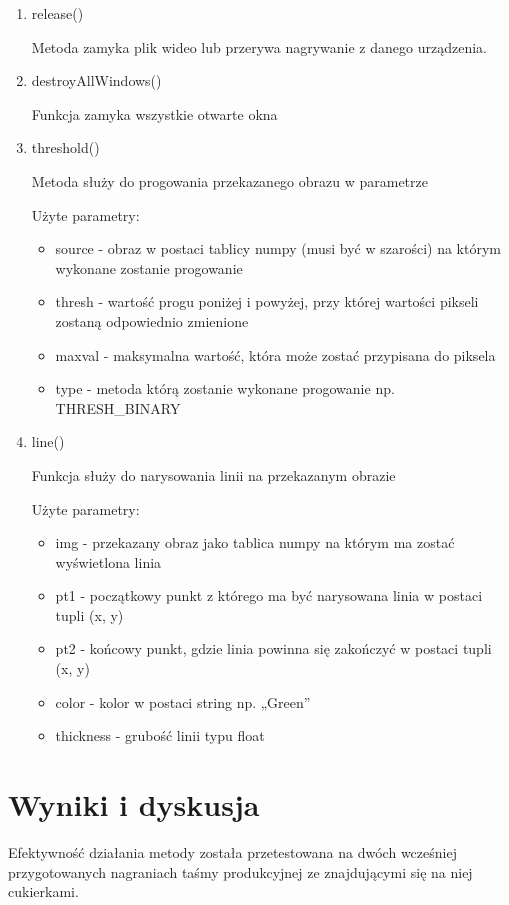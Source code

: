 \documentclass{article}
\begin{document}
\begin{enumerate}
\item release() \cite{opencv13}

Metoda zamyka plik wideo lub przerywa nagrywanie z danego urządzenia.

\item destroyAllWindows() \cite{opencv14}

Funkcja zamyka wszystkie otwarte okna

\item threshold() \cite{opencv15}

Metoda służy do progowania przekazanego obrazu w parametrze

Użyte parametry:

\begin{itemize}
\item source - obraz w postaci tablicy numpy (musi być w szarości) na którym wykonane zostanie progowanie
\item thresh - wartość progu poniżej i powyżej, przy której wartości pikseli zostaną odpowiednio zmienione
\item maxval - maksymalna wartość, która może zostać przypisana do piksela
\item type - metoda którą zostanie wykonane progowanie np. THRESH\_BINARY
\end{itemize}

\item line() \cite{opencv16}

Funkcja służy do narysowania linii na przekazanym obrazie

Użyte parametry:

\begin{itemize}
\item img - przekazany obraz jako tablica numpy na którym ma zostać wyświetlona linia
\item pt1 - początkowy punkt z którego ma być narysowana linia w postaci tupli (x, y)
\item pt2 - końcowy punkt, gdzie linia powinna się zakończyć w postaci tupli (x, y)
\item color - kolor w postaci string np. „Green”
\item thickness - grubość linii typu float
\end{itemize}

\end{enumerate}

\section{Wyniki i dyskusja}
\label{Wyniki i dyskusja}
Efektywność działania metody została przetestowana na dwóch wcześniej przygotowanych nagraniach taśmy produkcyjnej ze znajdującymi się na niej cukierkami.
\end{document}
